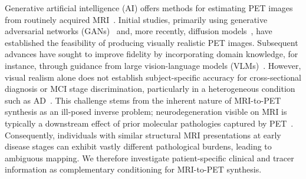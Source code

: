 Generative artificial intelligence (AI) offers methods for estimating PET images from routinely acquired MRI~\cite{dayarathna2024deep,lee2024synthesizing}. Initial studies, primarily using generative adversarial networks (GANs)~\cite{pan2018synthesizing,pan2020spatially,apostolopoulos2022applications} and, more recently, diffusion models~\cite{xie2024synthesizing,chen2025multi,theodorou2025mri2pet}, have established the feasibility of producing visually realistic PET images. Subsequent advances have sought to improve fidelity by incorporating domain knowledge, for instance, through guidance from large vision-language models (VLMs)~\cite{wang2025unisyn,liu2025direct}.  However, visual realism alone does not establish subject-specific accuracy for cross-sectional diagnosis or MCI stage discrimination, particularly in a heterogeneous condition such as AD~\cite{ossenkoppele2022amyloid}. This challenge stems from the inherent nature of MRI-to-PET synthesis as an ill-posed inverse problem; neurodegeneration visible on MRI is typically a downstream effect of prior molecular pathologies captured by PET~\cite{jagust2018imaging}. Consequently, individuals with similar structural MRI presentations at early disease stages can exhibit vastly different pathological burdens, leading to ambiguous mapping. We therefore investigate patient-specific clinical and tracer information as complementary conditioning for MRI-to-PET synthesis.
